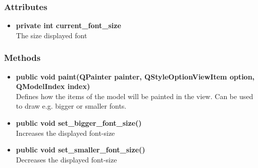 \subsubsection{Attributes}
\begin{itemize}
  \item \textbf{private int current\_font\_size}\\
  The size displayed font
\end{itemize}
\subsubsection{Methods}
\begin{itemize}
  \item \textbf{public void paint(QPainter painter, QStyleOptionViewItem option,
  QModelIndex index)}\\
  Defines how the items of the model will be painted in the view. Can be used to draw e.g. bigger or smaller fonts.
  \item \textbf{public void set\_bigger\_font\_size()}\\
  Increases the displayed font-size
  \item \textbf{public void set\_smaller\_font\_size()}\\
  Decreases the displayed font-size
\end{itemize}

\newpage
